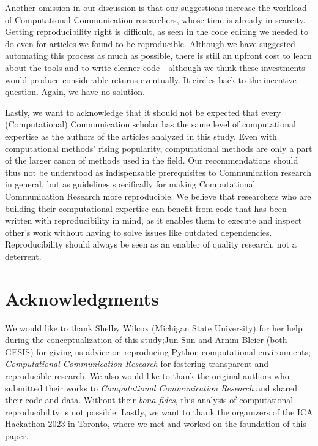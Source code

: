 Another omission in our discussion is that our suggestions increase the workload of Computational Communication researchers, whose time is already in scarcity. Getting reproducibility right is difficult, as seen in the code editing we needed to do even for articles we found to be reproducible. Although we have suggested automating this process as much as possible, there is still an upfront cost to learn about the tools and to write cleaner code---although we think these investments would produce considerable returns eventually. It circles back to the incentive question. Again, we have no solution.

Lastly, we want to acknowledge that it should not be expected that every (Computational) Communication scholar has the same level of computational expertise as the authors of the articles analyzed in this study. Even with computational methods' rising popularity, computational methods are only a part of the larger canon of methods used in the field. Our recommendations should thus not be understood as indispensable prerequisites to Communication research in general, but as guidelines specifically for making Computational Communication Research more reproducible. We believe that researchers who are building their computational expertise can benefit from code that has been written with reproducibility in mind, as it enables them to execute and inspect other's work without having to solve issues like outdated dependencies. Reproducibility should always be seen as an enabler of quality research, not a deterrent.

\section{Acknowledgments}

We would like to thank Shelby Wilcox (Michigan State University) for her help during the conceptualization of this study;Jun Sun and Arnim Bleier (both GESIS) for giving us advice on reproducing Python computational environments;
\textit{Computational Communication Research} for fostering transparent and reproducible research. We also would like to thank the original authors who submitted their works to \textit{Computational Communication Research} and shared their code and data. Without their \textit{bona fides}, this analysis of computational reproducibility is not possible. Lastly, we want to thank the organizers of the ICA Hackathon 2023 in Toronto, where we met and worked on the foundation of this paper.
